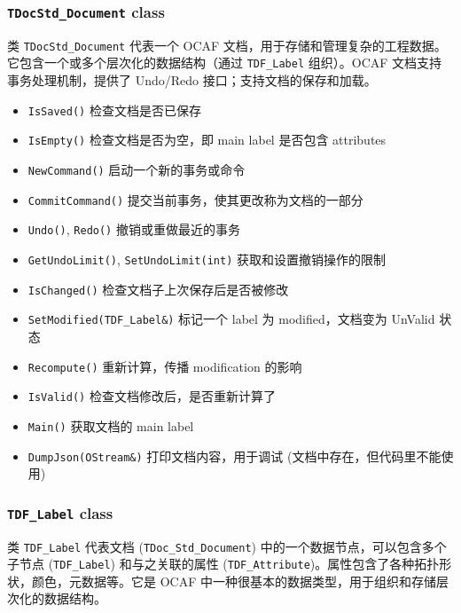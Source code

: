 \documentclass[11pt]{article}
\begin{document}
\subsubsection{\texttt{TDocStd\_Document} class}
\label{sec:org7492907}

类 \texttt{TDocStd\_Document} 代表一个 OCAF 文档，用于存储和管理复杂的工程数据。它包含一个或多个层次化的数据结构（通过 \texttt{TDF\_Label} 组织）。OCAF 文档支持事务处理机制，提供了 Undo/Redo 接口；支持文档的保存和加载。

\begin{itemize}
\item \texttt{IsSaved()} 检查文档是否已保存
\item \texttt{IsEmpty()} 检查文档是否为空，即 main label 是否包含 attributes
\item \texttt{NewCommand()} 启动一个新的事务或命令
\item \texttt{CommitCommand()} 提交当前事务，使其更改称为文档的一部分
\item \texttt{Undo()}, \texttt{Redo()} 撤销或重做最近的事务
\item \texttt{GetUndoLimit()}, \texttt{SetUndoLimit(int)} 获取和设置撤销操作的限制
\item \texttt{IsChanged()} 检查文档子上次保存后是否被修改
\item \texttt{SetModified(TDF\_Label\&)} 标记一个 label 为 modified，文档变为 UnValid 状态
\item \texttt{Recompute()} 重新计算，传播 modification 的影响
\item \texttt{IsValid()} 检查文档修改后，是否重新计算了
\item \texttt{Main()} 获取文档的 main label
\item \texttt{DumpJson(OStream\&)} 打印文档内容，用于调试 (文档中存在，但代码里不能使用)
\end{itemize}
\subsubsection{\texttt{TDF\_Label} class}
\label{sec:orga3bc639}

类 \texttt{TDF\_Label} 代表文档 (\texttt{TDoc\_Std\_Document}) 中的一个数据节点，可以包含多个子节点 (\texttt{TDF\_Label}) 和与之关联的属性 (\texttt{TDF\_Attribute})。属性包含了各种拓扑形状，颜色，元数据等。它是 OCAF 中一种很基本的数据类型，用于组织和存储层次化的数据结构。
\end{document}

